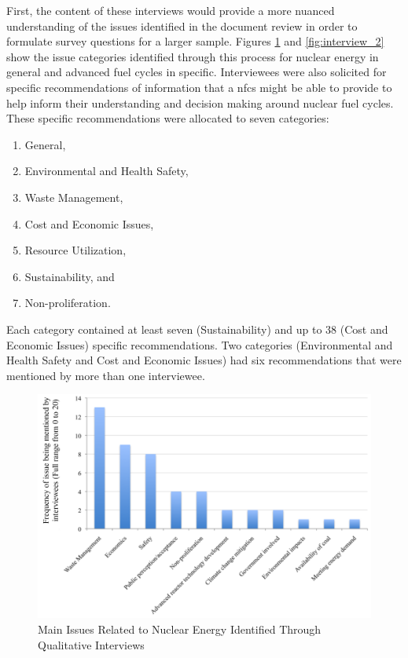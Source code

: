 First, the content of these interviews would provide a more nuanced
understanding of the issues identified in the document review in order to
formulate survey questions for a larger sample.  Figures \ref{fig:interview_1}
and \ref{fig:interview_2} show the issue categories identified through this
process for nuclear energy in general and advanced fuel cycles in specific.
Interviewees were also solicited for specific recommendations of information
that a \gls{nfcs} might be able to provide to help inform their understanding
and decision making around nuclear fuel cycles.  These specific
recommendations were allocated to seven categories:
\begin{enumerate}
\item General,
\item Environmental and Health Safety,
\item Waste Management,
\item Cost and Economic Issues,
\item Resource Utilization,
\item Sustainability, and
\item Non-proliferation.
\end{enumerate}

Each category contained at least seven (Sustainability) and up to 38 (Cost and
Economic Issues) specific recommendations.  Two categories (Environmental and
Health Safety and Cost and Economic Issues) had six recommendations that were
mentioned by more than one interviewee.

\begin{figure}[htbp]
\begin{center}
\includegraphics[width=0.7\columnwidth]{./images/interview_1}
\caption{Main Issues Related to Nuclear Energy Identified Through Qualitative Interviews}
\end{center}
\label{fig:interview_1}
\end{figure}

